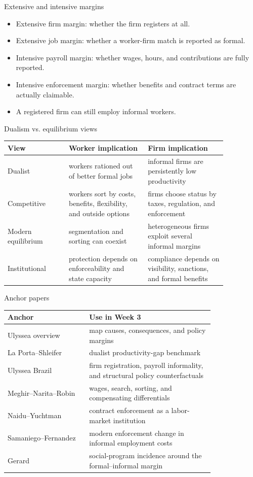 \documentclass[aspectratio=169,11pt]{beamer}
\begin{document}
\begin{frame}{Extensive and intensive margins}
\begin{itemize}
    \item Extensive firm margin: whether the firm registers at all.
    \item Extensive job margin: whether a worker-firm match is reported as formal.
    \item Intensive payroll margin: whether wages, hours, and contributions are fully reported.
    \item Intensive enforcement margin: whether benefits and contract terms are actually claimable.
    \item A registered firm can still employ informal workers.
\end{itemize}
\end{frame}

\begin{frame}{Dualism vs. equilibrium views}
\small
\begin{tabular}{p{0.24\linewidth} p{0.31\linewidth} p{0.31\linewidth}}
\toprule
View & Worker implication & Firm implication \\
\midrule
Dualist & workers rationed out of better formal jobs & informal firms are persistently low productivity \\
Competitive & workers sort by costs, benefits, flexibility, and outside options & firms choose status by taxes, regulation, and enforcement \\
Modern equilibrium & segmentation and sorting can coexist & heterogeneous firms exploit several informal margins \\
Institutional & protection depends on enforceability and state capacity & compliance depends on visibility, sanctions, and formal benefits \\
\bottomrule
\end{tabular}
\end{frame}

\begin{frame}{Anchor papers}
\small
\begin{tabular}{p{0.32\linewidth} p{0.49\linewidth}}
\toprule
Anchor & Use in Week 3 \\
\midrule
Ulyssea overview & map causes, consequences, and policy margins \\
La Porta--Shleifer & dualist productivity-gap benchmark \\
Ulyssea Brazil & firm registration, payroll informality, and structural policy counterfactuals \\
Meghir--Narita--Robin & wages, search, sorting, and compensating differentials \\
Naidu--Yuchtman & contract enforcement as a labor-market institution \\
Samaniego--Fernandez & modern enforcement change in informal employment costs \\
Gerard & social-program incidence around the formal--informal margin \\
\bottomrule
\end{tabular}
\end{frame}
\end{document}
